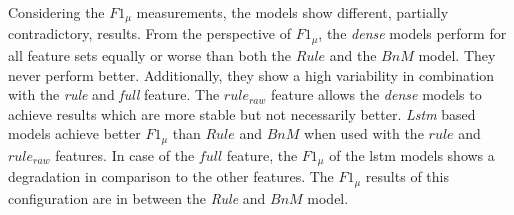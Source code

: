 Considering the \textbf{\(F1_\mu\)} measurements, the models show different, partially contradictory, results.
From the perspective of \(F1_\mu\), the \emph{dense} models perform for all feature sets equally or worse than both the \(Rule\) and the \(BnM\) model.
They never perform better.
Additionally, they show a high variability in combination with the \emph{rule} and \emph{full} feature.
The \(rule_{raw}\) feature allows the \emph{dense} models to achieve results which are more stable but not necessarily better.
\emph{Lstm} based models achieve better \(F1_\mu\) than \(Rule\) and \(BnM\) when used with the \(rule\) and \(rule_{raw}\) features.
In case of the \(full\) feature, the \(F1_\mu\) of the \gls{lstm} models shows a degradation in comparison to the other features.
The \(F1_\mu\) results of this configuration are in between the \emph{Rule} and \(BnM\) model.

